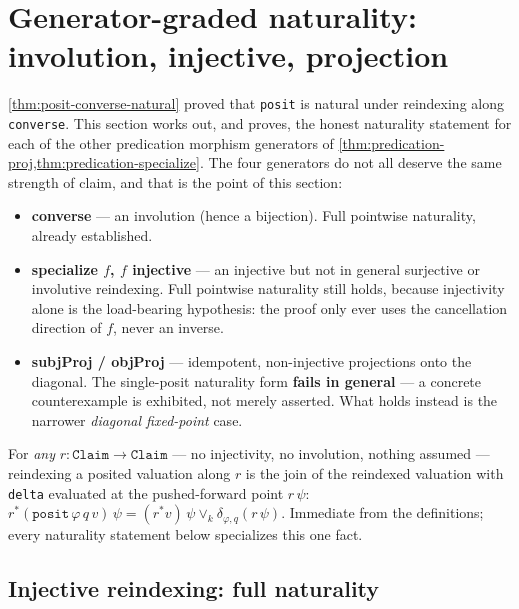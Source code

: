 \section{Generator-graded naturality: involution, injective, projection}

\cref{thm:posit-converse-natural} proved that \texttt{posit} is natural under
reindexing along \texttt{converse}. This section works out, and proves, the
honest naturality statement for each of the other predication morphism
generators of \cref{thm:predication-proj,thm:predication-specialize}. The
four generators do not all deserve the same strength of claim, and that is
the point of this section:

\begin{itemize}
\item \textbf{converse} --- an involution (hence a bijection). Full pointwise
naturality, already established.
\item \textbf{specialize \(f\), \(f\) injective} --- an injective but not in
general surjective or involutive reindexing. Full pointwise naturality still
holds, because injectivity alone is the load-bearing hypothesis: the proof
only ever uses the cancellation direction of \(f\), never an inverse.
\item \textbf{subjProj / objProj} --- idempotent, non-injective projections
onto the diagonal. The single-posit naturality form \textbf{fails in
general} --- a concrete counterexample is exhibited, not merely asserted.
What holds instead is the narrower \emph{diagonal fixed-point} case.
\end{itemize}

\begin{theorem}\label{thm:reindex-posit-exchange}\leanok{}
For \emph{any} \(r : \mathtt{Claim} \to \mathtt{Claim}\) --- no injectivity,
no involution, nothing assumed --- reindexing a posited valuation along \(r\)
is the join of the reindexed valuation with \texttt{delta} evaluated at the
pushed-forward point \(r\,\psi\): \(r^{*}(\texttt{posit}\,\varphi\,q\,v)\,\psi
= (r^{*}v)\,\psi \vee_k \delta_{\varphi,q}(r\,\psi)\). Immediate from the
definitions; every naturality statement below specializes this one fact.
\end{theorem}

\subsection*{Injective reindexing: full naturality}

